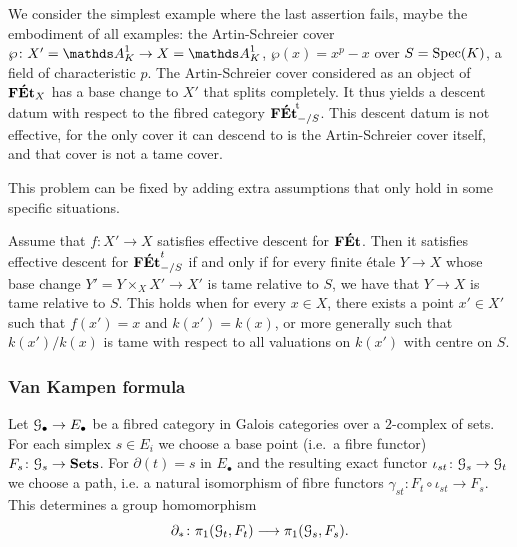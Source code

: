 \begin{ex}
We consider the simplest example where the last assertion fails, maybe the embodiment of all examples: the Artin-Schreier cover $\wp \colon X' = \bA^1_K \to X = \bA^1_K$, $\wp(x) = x^p - x$ over $S = \operatorname{Spec}(K)$, a field of characteristic $p$. The Artin-Schreier cover considered as an object of $\mathbf{F\acute{E}t}_X$ has a base change to $X'$ that splits completely. It thus yields a descent datum with respect to the fibred category ${\mathbf{F\acute{E}t}}^{\!\mathrm{t}}_{-/S}$. This descent datum is not effective, for the only cover it can descend to is the Artin-Schreier cover itself, and that cover is not a tame cover.
\end{ex}

This problem can be fixed by adding extra assumptions that only hold in some specific situations.

\begin{lem}\label{lem:f-eff-desc-for-FEt-and-FEtt}
    Assume that $f\colon X'\to X$ satisfies effective descent for $\mathbf{F\acute{E}t}$. Then it satisfies effective descent for $\mathbf{F\acute{E}t}^t_{-/S}$ if and only if for every finite \'etale $Y\to X$ whose base change $Y'=Y\times_X X'\to X'$ is tame relative to $S$, we have that $Y\to X$ is tame relative to $S$. This holds when for every $x\in X$, there exists a point $x'\in X'$ such that $f(x')=x$ and $k(x')=k(x)$, or more generally such that $k(x')/k(x)$ is tame with respect to all valuations on $k(x')$ with centre on $S$.
\end{lem}

\subsubsection*{Van Kampen formula} 
Let ${\mathcal G}_\bullet \to E_\bullet$ be a fibred category in Galois categories over a $2$-complex of sets. For each simplex $s \in E_i$ we choose a base point (i.e.\ a fibre functor) $F_s \colon {\mathcal G}_s \to \mathbf{Sets}$.
For $\partial(t) = s$ in $E_\bullet$ and the resulting exact functor $\iota_{st} \colon {\mathcal G}_s \to {\mathcal G}_t$ we choose a path, i.e. a natural isomorphism of fibre functors  $\gamma_{st} \colon F_t \circ \iota_{st} \to F_s$. This determines a group homomorphism 
\begin{equation}
\label{eq:boundary map 2-complex of pi1s}
    \partial_\ast \colon \pi_1({\mathcal G}_t ,F_t)\longrightarrow \pi_1({\mathcal G}_s,F_s).
\end{equation}

